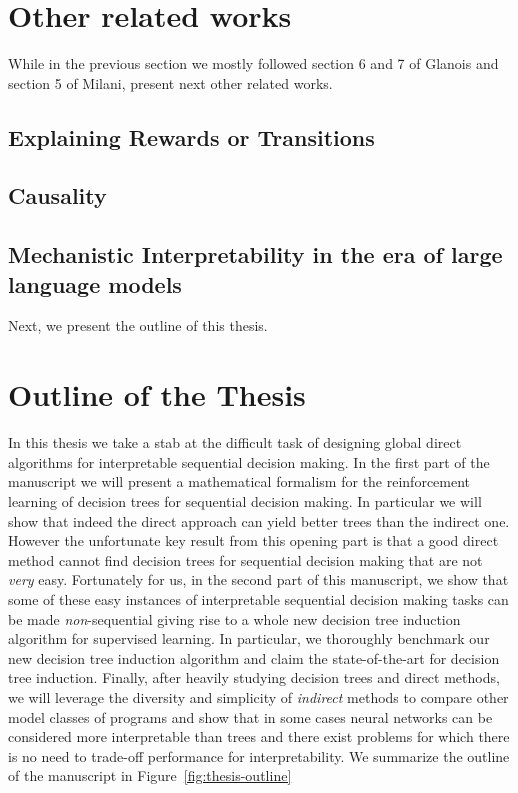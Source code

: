 \section{Other related works}
While in the previous section we mostly followed section 6 and 7 of Glanois and section 5 of Milani, present next other related works.
\subsection{Explaining Rewards or Transitions}
\subsection{Causality}
\subsection{Mechanistic Interpretability in the era of large language models}


Next, we present the outline of this thesis.
\section{Outline of the Thesis}

In this thesis we take a stab at the difficult task of designing global direct algorithms for interpretable sequential decision making. In the first part of the manuscript we will present a mathematical formalism for the reinforcement learning of decision trees for sequential decision making. In particular we will show that indeed the direct approach can yield better trees than the indirect one. However the unfortunate key result from this opening part is that a good direct method cannot find decision trees for sequential decision making that are not \textit{very} easy.
Fortunately for us, in the second part of this manuscript, we show that some of these easy instances of interpretable sequential decision making tasks can be made \textit{non}-sequential giving rise to a whole new decision tree induction algorithm for supervised learning. In particular, we thoroughly benchmark our new decision tree induction algorithm and claim the state-of-the-art for decision tree induction.
Finally, after heavily studying decision trees and direct methods, we will leverage the diversity and simplicity of \textit{indirect} methods to compare other model classes of programs and show that in some cases neural networks can be considered more interpretable than trees and there exist problems for which there is no need to trade-off performance for interpretability. 
We summarize the outline of the manuscript in Figure~\ref{fig:thesis-outline} 

